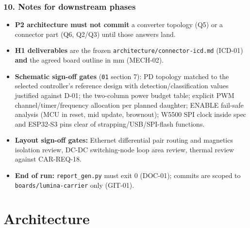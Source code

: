 \documentclass[11pt,a4paper]{article}
\begin{document}
\subsubsection*{10. Notes for downstream phases}
\begin{itemize}
\item \textbf{P2 architecture must not commit} a converter topology (Q5) or a connector part (Q6, Q2/Q3)
until those answers land.
\item \textbf{H1 deliverables} are the frozen \texttt{architecture/connector-icd.md} (ICD-01) \textbf{and} the agreed
board outline in mm (MECH-02).
\item \textbf{Schematic sign-off gates} (\texttt{01} section 7): PD topology matched to the selected controller's
reference design with detection/classification values justified against D-01; the two-column
power budget table; explicit PWM channel/timer/frequency allocation per planned daughter;
ENABLE fail-safe analysis (MCU in reset, mid update, brownout); W5500 SPI clock inside spec and
ESP32-S3 pins clear of strapping/USB/SPI-flash functions.
\item \textbf{Layout sign-off gates:} Ethernet differential pair routing and magnetics isolation review,
DC-DC switching-node loop area review, thermal review against CAR-REQ-18.
\item \textbf{End of run:} \texttt{report\_gen.py} must exit 0 (DOC-01); commits are scoped to
\texttt{boards/lumina-carrier} only (GIT-01).
\end{itemize}
\section{Architecture}
\end{document}
